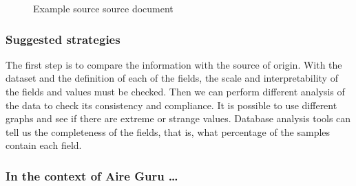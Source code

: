 \begin{figure}[ht]
\centering
{}
\caption{Example source source document}
\end{figure}

\subsubsection*{Suggested strategies} 

The first step is to compare the information with the source of origin. With the dataset and the definition
of each of the fields, the scale and interpretability of the fields and values must be checked.
Then we can perform different analysis of the data to check its consistency and compliance.
It is possible to use different graphs and see if there are extreme or strange values.
Database analysis tools can tell us the completeness of the fields, that is, what percentage of the
samples contain each field.

\subsubsection*{In the context of Aire Guru \ldots} 

